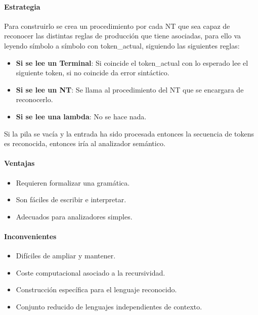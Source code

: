 \documentclass[12pt, twoside, openright]{report} %
\begin{document}
\paragraph{Estrategia}

Para construirlo se crea un procedimiento por cada NT que sea capaz de
reconocer las distintas reglas de producción que tiene asociadas, para
ello va leyendo símbolo a símbolo con token\_actual, siguiendo las
siguientes reglas:

\begin{itemize}

\item
\textbf{Si se lee un Terminal}: Si coincide el token\_actual con lo esperado
  lee el siguiente token, si no coincide da error sintáctico.
\item
\textbf{Si se lee un NT}: Se llama al procedimiento del NT que se encargara de
  reconocerlo.
\item
\textbf{Si se lee una lambda}: No se hace nada.
\end{itemize}

Si la pila se vacía y la entrada ha sido procesada entonces la secuencia
de tokens es reconocida, entonces iría al analizador semántico.


\paragraph{Ventajas}

\begin{itemize}

\item
  Requieren formalizar una gramática.
\item
  Son fáciles de escribir e interpretar.
\item
  Adecuados para analizadores simples.
\end{itemize}


\paragraph{Inconvenientes}

\begin{itemize}

\item
  Difíciles de ampliar y mantener.
\item
  Coste computacional asociado a la recursividad.
\item
  Construcción específica para el lenguaje reconocido.
\item
  Conjunto reducido de lenguajes independientes de contexto.
\end{itemize}
 
\end{document}
